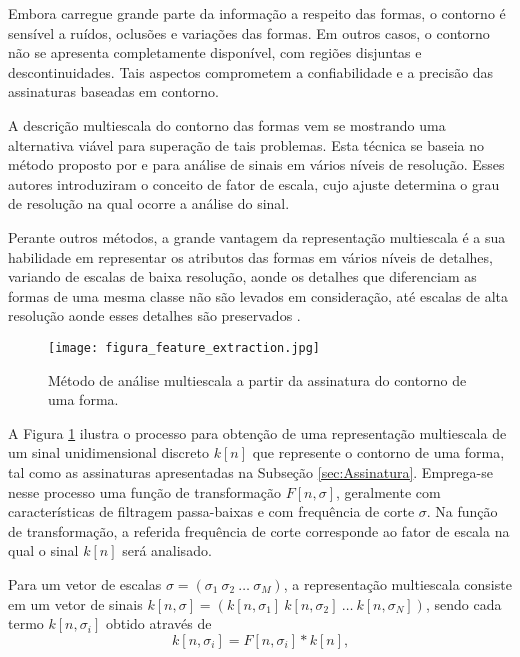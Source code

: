Embora carregue grande parte da informação a respeito das formas, o contorno é  sensível a ruídos, oclusões e variações das formas.  Em outros casos, o contorno não se apresenta completamente disponível, com regiões disjuntas e descontinuidades. Tais aspectos comprometem a confiabilidade e a precisão das assinaturas baseadas em contorno.  

A descrição multiescala do contorno das formas vem se mostrando uma alternativa viável para superação de tais problemas. Esta técnica se baseia no método proposto por  e  para análise de sinais em vários níveis de resolução. Esses autores introduziram o conceito de fator de escala, cujo ajuste determina o grau de resolução na qual ocorre a análise do sinal. 

Perante outros métodos, a grande vantagem da representação multiescala é a sua habilidade em representar os atributos das formas em vários níveis de detalhes, variando de escalas de baixa resolução, aonde os detalhes que diferenciam as formas de uma mesma classe não são levados em consideração, até escalas de alta resolução aonde esses detalhes são preservados \cite{Ullman:1996}.

\begin{figure}[t]
  \caption{\label{fig:ms} Método de análise multiescala a partir da assinatura do contorno de uma forma.}
  \centering
  \texttt{[image: figura\_feature\_extraction.jpg]}
\end{figure}

A Figura \ref{fig:ms} ilustra o processo para obtenção de uma representação multiescala de um sinal unidimensional discreto $k[n]$ que represente o contorno de uma forma, tal como as assinaturas apresentadas na Subseção \ref{sec:Assinatura}. Emprega-se nesse processo uma função de transformação $F[n,\sigma]$, geralmente com características de filtragem passa-baixas e com frequência de corte $\sigma$. Na função de transformação, a referida frequência de corte corresponde ao fator de escala na qual o sinal $k[n]$ será analisado. 

Para um vetor de escalas $\sigma = (\sigma_1\:\sigma_2\:\ldots\:\sigma_M) $, a representação multiescala consiste em um vetor de sinais $k[n,\sigma] = (k[n,\sigma_1]\:k[n,\sigma_2]\:\ldots\:k[n,\sigma_N])$, sendo cada termo $k[n,\sigma_i]$ obtido através de
\begin{equation}\label{eq:ms1}
k[n,\sigma_i] = F[n,\sigma_i]*k[n]\text{,}
\end{equation}

